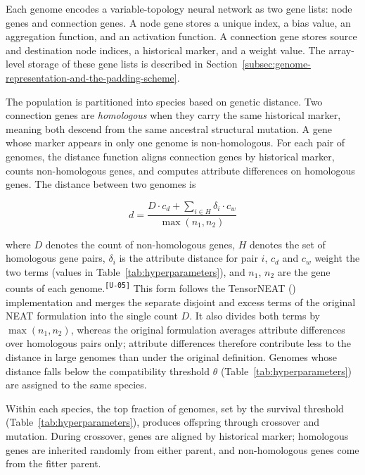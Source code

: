 \documentclass[12pt]{article}
\newcommand{\revID}[1]{\textsuperscript{\scriptsize\texttt{[#1]}}}
\newcommand{\revUnclear}[2]{\textcolor{revBlue}{#2}\revID{#1}}
\begin{document}
Each genome encodes a variable-topology neural network as two gene lists: node genes and connection genes.
A node gene stores a unique index, a bias value, an aggregation function, and an activation function.
A connection gene stores source and destination node indices, a historical marker, and a weight value.
The array-level storage of these gene lists is described in Section~\ref{subsec:genome-representation-and-the-padding-scheme}.

The population is partitioned into species based on genetic distance.
Two connection genes are \emph{homologous} when they carry the same historical marker, meaning both descend from the same ancestral structural mutation. A gene whose marker appears in only one genome is non-homologous.
For each pair of genomes, the distance function aligns connection genes by historical marker, counts non-homologous genes, and computes attribute differences on homologous genes.
The distance between two genomes is

\[d = \frac{D \cdot c_d + \sum_{i \in H} \delta_i \cdot c_w}{\max(n_1, n_2)}\]

\revUnclear{U-05}{where $D$ denotes the count of non-homologous genes, $H$ denotes the set of homologous gene pairs, $\delta_i$ is the attribute distance for pair $i$, $c_d$ and $c_w$ weight the two terms (values in Table~\ref{tab:hyperparameters}), and $n_1$, $n_2$ are the gene counts of each genome.}
This form follows the TensorNEAT (\cite{wang_tensorized_2024}) implementation and merges the separate disjoint and excess terms of the original NEAT formulation into the single count $D$.
It also divides both terms by $\max(n_1, n_2)$, whereas the original formulation averages attribute differences over homologous pairs only; attribute differences therefore contribute less to the distance in large genomes than under the original definition.
Genomes whose distance falls below the compatibility threshold $\theta$ (Table~\ref{tab:hyperparameters}) are assigned to the same species.

Within each species, the top fraction of genomes, set by the survival threshold (Table~\ref{tab:hyperparameters}), produces offspring through crossover and mutation.
During crossover, genes are aligned by historical marker; homologous genes are inherited randomly from either parent, and non-homologous genes come from the fitter parent.

\end{document}
